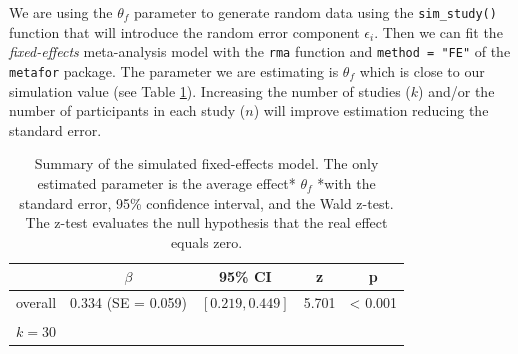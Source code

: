 \documentclass[
  man,floatsintext]{apa6}
\newenvironment{Shaded}{\begin{snugshade}}{\end{snugshade}}
\newcommand{\AttributeTok}[1]{\textcolor[rgb]{0.77,0.63,0.00}{#1}}
\newcommand{\CommentTok}[1]{\textcolor[rgb]{0.56,0.35,0.01}{\textit{#1}}}
\newcommand{\DecValTok}[1]{\textcolor[rgb]{0.00,0.00,0.81}{#1}}
\newcommand{\FloatTok}[1]{\textcolor[rgb]{0.00,0.00,0.81}{#1}}
\newcommand{\FunctionTok}[1]{\textcolor[rgb]{0.00,0.00,0.00}{#1}}
\newcommand{\NormalTok}[1]{#1}
\newcommand{\OtherTok}[1]{\textcolor[rgb]{0.56,0.35,0.01}{#1}}
\newcommand{\SpecialCharTok}[1]{\textcolor[rgb]{0.00,0.00,0.00}{#1}}
\newcommand{\StringTok}[1]{\textcolor[rgb]{0.31,0.60,0.02}{#1}}
\begin{document}
\begin{Shaded}
\end{Shaded}

\normalsize

We are using the \(\theta_{f}\) parameter to generate random data using the \texttt{sim\_study()} function that will introduce the random error component \(\epsilon_{i}\). Then we can fit the \emph{fixed-effects} meta-analysis model with the \texttt{rma} function and \texttt{method\ =\ "FE"} of the \texttt{metafor} package. The parameter we are estimating is \(\theta_{f}\) which is close to our simulation value (see Table \ref{tab:res-fixed-effect}). Increasing the number of studies (\(k\)) and/or the number of participants in each study (\(n\)) will improve estimation reducing the standard error.

\scriptsize

\begin{table}[H]

\caption{\label{tab:res-fixed-effect}Summary of the simulated fixed-effects model. The only estimated parameter is the average effect* \(\theta_{f}\) *with the standard error,
95\% confidence interval, and the Wald z-test. The z-test evaluates the null hypothesis that the real effect equals zero.}
\centering
\fontsize{9}{11}\selectfont
\begin{tabular}[t]{ccccc}
\toprule
 & $\beta$ & 95\% CI & z & p\\
\midrule
overall & 0.334 (SE = 0.059) & $[0.219, 0.449]$ & 5.701 & < 0.001\\
\bottomrule
\multicolumn{5}{l}{\textsuperscript{} $k = 30$}\\
\end{tabular}
\end{table}
\end{document}
